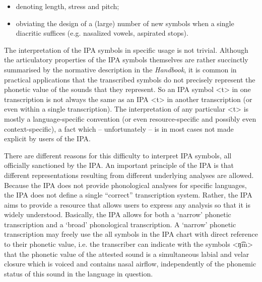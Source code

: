 \begin{itemize}

 	\item denoting length, stress and pitch;
	\item obviating the design of a (large) number of new symbols when a 
		  single diacritic suffices (e.g. nasalized vowels, aspirated stops). 
               
\end{itemize}	

The interpretation of the IPA symbols in specific usage is not trivial. Although
the articulatory properties of the IPA symbols themselves are rather succinctly
summarised by the normative description in the \textit{Handbook}, it is common
in practical applications that the transcribed symbols do not precisely
represent the phonetic value of the sounds that they represent. So an IPA symbol
<t> in one transcription is not always the same as an IPA <t> in another
transcription (or even within a single transcription). The interpretation of any
particular <t> is mostly a language-specific convention (or even
resource-specific and possibly even context-specific), a fact which --
unfortunately -- is in most cases not made explicit by users of the IPA.

There are different reasons for this difficulty to interpret IPA symbols, all
officially sanctioned by the IPA. An important principle of the IPA is that
different representations resulting from different underlying analyses are
allowed. Because the IPA does not provide phonological analyses for specific
languages, the IPA does not define a single ``correct'' transcription system.
Rather, the IPA aims to provide a resource that allows users to express any
analysis so that it is widely understood. Basically, the IPA allows for both a 
`narrow' phonetic transcription and a `broad' phonological transcription. 
A `narrow' phonetic transcription may freely use the all symbols in the IPA 
chart with direct reference to their phonetic value, i.e. the transcriber can 
indicate with the symbols <ŋ͡m> that the phonetic value of the attested sound 
is a simultaneous labial and velar closure which is voiced and contains nasal 
airflow, independently of the phonemic status of this sound in the language in 
question. 


